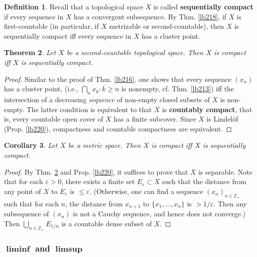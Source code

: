 \documentclass[12pt,b5paper,notitlepage]{article}
\theoremstyle{definition}
\newtheorem{df}{Definition}[subsection]
\theoremstyle{plain}
\newtheorem{thm}[df]{Theorem}
\newtheorem{co}[df]{Corollary}
\newcommand{\ovl}{\overline}
\newcommand{\Zbb}{\mathbb Z}
\newcommand{\eps}{\varepsilon}
\numberwithin{equation}{section}
\begin{document}
\begin{df}
Recall that a topological space $X$ is called \textbf{sequentially compact}  if every sequence in $X$ has a convergent subsequence. By Thm. \ref{lb218}, if $X$ is first-countable (in particular, if $X$ metrizable or second-countable), then $X$ is sequentially compact iff every sequence in $X$ has a cluster point.
\end{df}


\begin{thm}\label{lb219}
Let $X$ be a second-countable topological space. Then $X$ is compact iff $X$ is sequentially compact.
\end{thm}


\begin{proof}
Similar to the proof of Thm. \ref{lb216}, one shows that every sequence $(x_n)$ has a cluster point, (i.e., $\bigcap_n\ovl{x_k:k\geq n}$ is nonempty, cf. Thm. \ref{lb213}) iff the intersection of a decreasing \textit{sequence} of non-empty closed subsets of $X$ is non-empty. The latter condition is equivalent to that $X$ is \textbf{countably compact}, that is, every countable open cover of $X$ has a finite subcover. Since $X$ is Lindel\"of (Prop. \ref{lb220}), compactness and countable compactness are equivalent.
\end{proof}



\begin{co}
Let $X$ be a metric space. Then $X$ is compact iff $X$ is sequentially compact.
\end{co}

\begin{proof}
By Thm. \ref{lb219} and Prop. \ref{lb220}, it suffices to prove that $X$ is separable. Note that for each $\eps>0$, there exists a finite set $E_\eps\subset X$ such that the distance from any point of $X$ to $E_\eps$ is $\leq \eps$. (Otherwise, one can find a sequence $(x_n)_{n\in\Zbb_+}$ such that for each $n$, the distance from $x_{n+1}$ to $\{x_1,\dots,x_n\}$ is $>1/\eps$. Then any subsequence of $(x_n)$ is not a Cauchy sequence, and hence does not converge.) Then $\bigcup_{n\in\Zbb_+}E_{1/n}$ is a countable dense subset of $X$.
\end{proof}




\subsubsection{$\pmb\liminf$ and $\pmb\limsup$}
\end{document}
